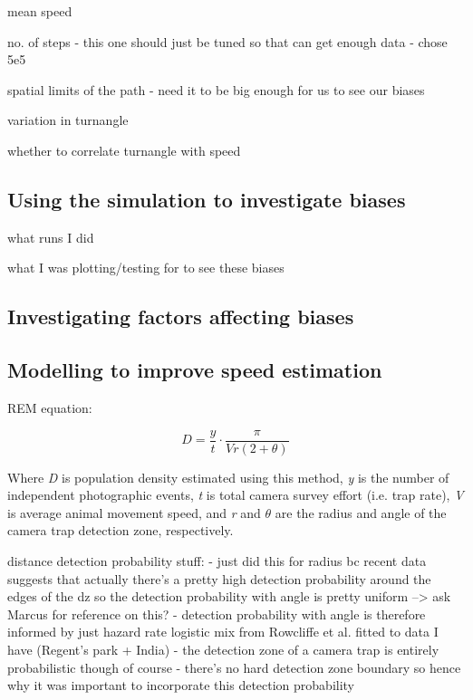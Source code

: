 \documentclass[a4paper,12pt,twoside]{report}
\begin{document}
	mean speed
	
	no. of steps
	- this one should just be tuned so that can get enough data 
	- chose 5e5
	
	spatial limits of the path
	- need it to be big enough for us to see our biases
	
	variation in turnangle
	
	whether to correlate turnangle with speed
	
	\subsection{Using the simulation to investigate biases}
	
	what runs I did
	
	what I was plotting/testing for to see these biases
	
	
	
	
	\subsection{Investigating factors affecting biases}
	
	
	
	
	\subsection{Modelling to improve speed estimation}
	

	
	
	REM equation:
	
		\begin{equation}
			D = \frac{y}{t} \cdot \frac{\pi}{Vr(2 + \theta)}
	\end{equation}
	
	Where \textit{D} is population density estimated using this method, \textit{y} is the number of independent photographic events, \textit{t} is total camera survey effort (i.e. trap rate), \textit{V} is average animal movement speed, and \textit{r} and \begin{math}\theta\end{math} are the radius and angle of the camera trap detection zone, respectively. 
	
	
	distance detection probability stuff:
	- just did this for radius bc recent data suggests that actually there's a pretty high detection probability around the edges of the dz so the detection probability with angle is pretty uniform --> ask Marcus for reference on this?
	- detection probability with angle is therefore informed by just hazard rate logistic mix from Rowcliffe et al. fitted to data I have (Regent's park + India)
	- the detection zone of a camera trap is entirely probabilistic though of course - there's no hard detection zone boundary so hence why it was important to incorporate this detection probability
	
\end{document}
